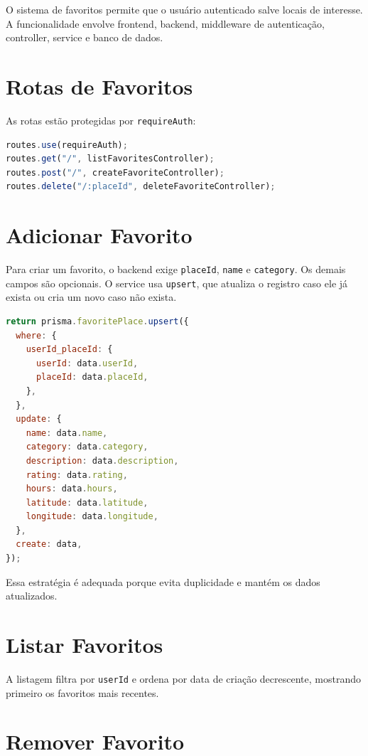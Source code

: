 \documentclass[
    12pt,
    oneside,
    openright,
    a4paper,
    english,
    brazil
]{abntex2}
\begin{document}
O sistema de favoritos permite que o usuário autenticado salve locais de interesse. A funcionalidade envolve frontend, backend, middleware de autenticação, controller, service e banco de dados.

\section{Rotas de Favoritos}

As rotas estão protegidas por \texttt{requireAuth}:

\begin{lstlisting}[language=JavaScript, caption={Rotas de favoritos}]
routes.use(requireAuth);
routes.get("/", listFavoritesController);
routes.post("/", createFavoriteController);
routes.delete("/:placeId", deleteFavoriteController);
\end{lstlisting}

\section{Adicionar Favorito}

Para criar um favorito, o backend exige \texttt{placeId}, \texttt{name} e \texttt{category}. Os demais campos são opcionais. O service usa \texttt{upsert}, que atualiza o registro caso ele já exista ou cria um novo caso não exista.

\begin{lstlisting}[language=JavaScript, caption={Upsert de favorito}]
return prisma.favoritePlace.upsert({
  where: {
    userId_placeId: {
      userId: data.userId,
      placeId: data.placeId,
    },
  },
  update: {
    name: data.name,
    category: data.category,
    description: data.description,
    rating: data.rating,
    hours: data.hours,
    latitude: data.latitude,
    longitude: data.longitude,
  },
  create: data,
});
\end{lstlisting}

Essa estratégia é adequada porque evita duplicidade e mantém os dados atualizados.

\section{Listar Favoritos}

A listagem filtra por \texttt{userId} e ordena por data de criação decrescente, mostrando primeiro os favoritos mais recentes.

\section{Remover Favorito}
\end{document}
